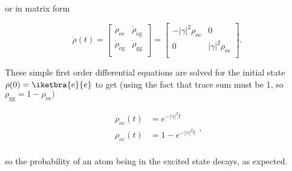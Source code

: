 
\noindent or in matrix form

\begin{equation}
  \dot{\rho}(t) =
  \begin{bmatrix}
    \dot{\rho}_\text{ee} & \dot{\rho}_\text{eg}\\
    \dot{\rho}_\text{eg} & \dot{\rho}_\text{gg}\\
  \end{bmatrix}
  =
  \begin{bmatrix}
    -|\gamma|^2\rho_\text{ee} & 0\\
    0 & |\gamma|^2\rho_\text{ee}\\
  \end{bmatrix}.
\end{equation}

\noindent These  simple first  order differential equations  are solved
for the initial state $\rho(0) = \iketbra{e}{e}$ to get (using the fact
that trace sum must be 1, so $\rho_\text{gg} = 1 - \rho_\text{ee})$

\begin{equation}
  \begin{aligned}
    \rho_{ee}(t) & = e^{-|\gamma|^2t}\\
    \rho_{ee}(t) & = 1 - e^{-|\gamma|^2t}\\
  \end{aligned},
\end{equation}

\noindent so  the probability  of an  atom being  in the  excited state
decays, as expected.

